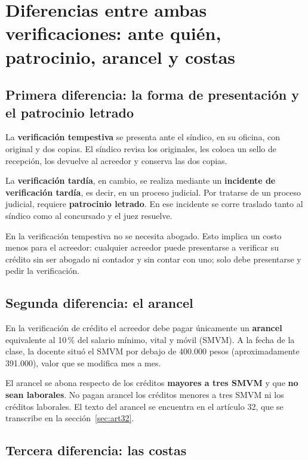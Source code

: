 \documentclass[12pt,oneside]{book}
\begin{document}
\section{Diferencias entre ambas verificaciones: ante quién, patrocinio, arancel y costas}

\subsection{Primera diferencia: la forma de presentación y el patrocinio letrado}

La \textbf{verificación tempestiva} se presenta ante el síndico, en su oficina, con original y dos copias. El síndico revisa los originales, les coloca un sello de recepción, los devuelve al acreedor y conserva las dos copias.

La \textbf{verificación tardía}, en cambio, se realiza mediante un \textbf{incidente de verificación tardía}, es decir, en un proceso judicial. Por tratarse de un proceso judicial, requiere \textbf{patrocinio letrado}. En ese incidente se corre traslado tanto al síndico como al concursado y el juez resuelve.

En la verificación tempestiva no se necesita abogado. Esto implica un costo menos para el acreedor: cualquier acreedor puede presentarse a verificar su crédito sin ser abogado ni contador y sin contar con uno; solo debe presentarse y pedir la verificación.

\subsection{Segunda diferencia: el arancel}

En la verificación de crédito el acreedor debe pagar únicamente un \textbf{arancel} equivalente al 10\,\% del salario mínimo, vital y móvil (SMVM). A la fecha de la clase, la docente situó el SMVM por debajo de 400.000 pesos (aproximadamente 391.000), valor que se modifica mes a mes.

El arancel se abona respecto de los créditos \textbf{mayores a tres SMVM} y que \textbf{no sean laborales}. No pagan arancel los créditos menores a tres SMVM ni los créditos laborales. El texto del arancel se encuentra en el artículo 32, que se transcribe en la sección~\ref{sec:art32}.

\subsection{Tercera diferencia: las costas}
\end{document}
